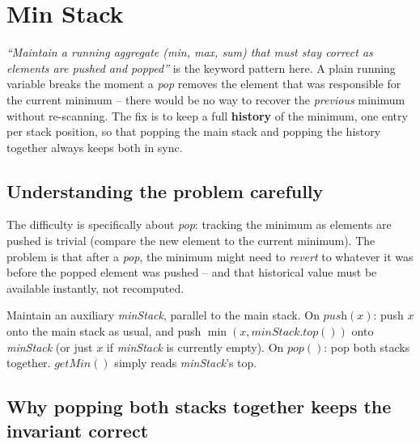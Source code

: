 \section{Min Stack}
\label{sec:sq-min-stack}


\begin{patternbox}
\emph{``Maintain a running aggregate (min, max, sum) that must stay
correct as elements are pushed \emph{and} popped''} is the keyword
pattern here. A plain running variable breaks the moment a \textit{pop}
removes the element that was responsible for the current minimum -- there
would be no way to recover the \emph{previous} minimum without
re-scanning. The fix is to keep a full \textbf{history} of the minimum, one
entry per stack position, so that popping the main stack and popping the
history together always keeps both in sync.
\end{patternbox}

\subsection*{Understanding the problem carefully}

The difficulty is specifically about \textit{pop}: tracking the minimum
as elements are pushed is trivial (compare the new element to the current
minimum). The problem is that after a \textit{pop}, the minimum might need
to \emph{revert} to whatever it was before the popped element was pushed
-- and that historical value must be available instantly, not
recomputed.

\begin{ideabox}
Maintain an auxiliary \textit{minStack}, parallel to the main stack. On
$\textit{push}(x)$: push $x$ onto the main stack as usual, and push
$\min(x, \textit{minStack.top}())$ onto \textit{minStack} (or just $x$ if
\textit{minStack} is currently empty). On $\textit{pop}()$: pop both
stacks together. $\textit{getMin}()$ simply reads \textit{minStack}'s
top.
\end{ideabox}

\subsection*{Why popping both stacks together keeps the invariant correct}

